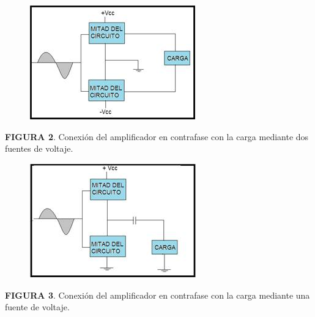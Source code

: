 \documentclass[12pt]{article}
\begin{document}

\begin{figure}[H]
	\begin{Center}
		\includegraphics[width=2.82in,height=1.95in]{./media/image2.jpeg}
	\end{Center}
\end{figure}



\par

\textbf{FIGURA 2}. Conexión del amplificador en contrafase con la carga mediante dos fuentes de voltaje.\par




\begin{figure}[H]
	\begin{Center}
		\includegraphics[width=2.83in,height=1.95in]{./media/image3.jpeg}
	\end{Center}
\end{figure}



\par

\textbf{FIGURA 3}. Conexión del amplificador en contrafase con la carga mediante una fuente de voltaje.\par
\end{document}
